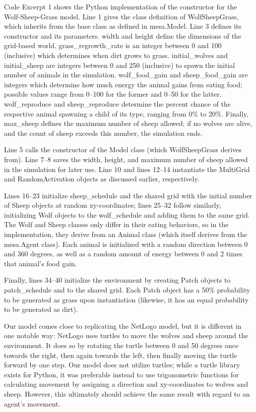 \begin{multicols}{2}
    Code Excerpt 1 shows the Python implementation of the constructor for the
    Wolf-Sheep-Grass model.
    Line 1 gives the class definition of WolfSheepGrass,
    which inherits from the base class as defined in mesa.Model.
    Line 3 defines its constructor and its parameters.
    width and height define the dimensions of the grid-based world.
    grass\_regrowth\_rate is an integer between 0 and 100 (inclusive) which
    determines when dirt grows to grass.
    initial\_wolves and initial\_sheep are integers between 0 and 250 (inclusive)
    to spawn the initial number of animals in the simulation.
    wolf\_food\_gain and sheep\_food\_gain are integers which determine
    how much energy the animal gains from eating food;
    possible values range from 0--100 for the former and 0--50 for the latter.
    wolf\_reproduce and sheep\_reproduce determine the percent chance of the
    respective animal spawning a child of its type, ranging from 0\% to 20\%.
    Finally, max\_sheep defines the maximum number of sheep allowed;
    if no wolves are alive, and the count of sheep exceeds this number,
    the simulation ends.

    Line 5 calls the constructor of the Model class
    (which WolfSheepGrass derives from).
    Line 7--8 saves the width, height, and maximum number of sheep allowed
    in the simulation for later use.
    Line 10 and lines 12--14 instantiate the MultiGrid and RandomActivation objects
    as discussed earlier, respectively.

    Lines 16--23 initialize sheep\_schedule and the shared grid with the initial
    number of Sheep objects at random xy-coordinates;
    lines 25--32 follow similarly, initializing Wolf objects to the wolf\_schedule
    and adding them to the same grid.
    The Wolf and Sheep classes only differ in their eating behaviors,
    so in the implementation, they derive from an Animal class
    (which itself derives from the mesa.Agent class).
    Each animal is initialized with a random direction between 0 and 360 degrees,
    as well as a random amount of energy between 0 and 2 times that animal's food gain.

    Finally, lines 34--40 initialize the environment by creating Patch objects
    to patch\_schedule and to the shared grid.
    Each Patch object has a 50\% probability to be generated as grass upon
    instantiation (likewise, it has an equal probability to be generated as dirt).

    Our model comes close to replicating the NetLogo model,
    but it is different in one notable way: NetLogo uses turtles to move the wolves
    and sheep around the environment.
    It does so by rotating the turtle between 0 and 50 degrees once towards the
    right, then again towards the left, then finally moving the turtle
    forward by one step.
    Our model does not utilize turtles;
    while a turtle library exists for Python,
    it was preferable instead to use trigonometric functions for calculating
    movement by assigning a direction and xy-coordinates to wolves and sheep.
    However, this ultimately should achieve the same result with regard to an
    agent's movement.

\end{multicols}
